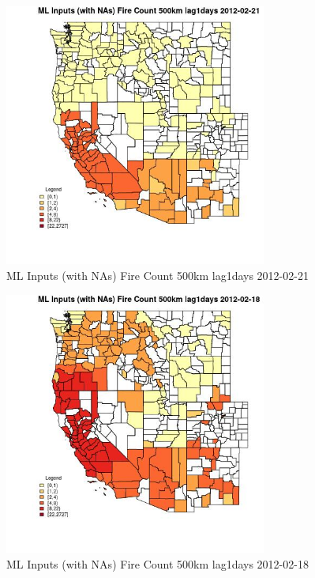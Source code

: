 \begin{figure} 
\centering  
\includegraphics[width=0.77\textwidth]{Code_Outputs/Report_ML_input_PM25_Step4_part_f_de_duplicated_aves_prioritize_24hr_obswNAs_CountyFire_Count_500km_lag1daysMean2012-02-21.jpg} 
\caption{\label{fig:Report_ML_input_PM25_Step4_part_f_de_duplicated_aves_prioritize_24hr_obswNAsCountyFire_Count_500km_lag1daysMean2012-02-21}ML Inputs (with NAs) Fire Count 500km lag1days 2012-02-21} 
\end{figure} 
 

\begin{figure} 
\centering  
\includegraphics[width=0.77\textwidth]{Code_Outputs/Report_ML_input_PM25_Step4_part_f_de_duplicated_aves_prioritize_24hr_obswNAs_CountyFire_Count_500km_lag1daysMean2012-02-18.jpg} 
\caption{\label{fig:Report_ML_input_PM25_Step4_part_f_de_duplicated_aves_prioritize_24hr_obswNAsCountyFire_Count_500km_lag1daysMean2012-02-18}ML Inputs (with NAs) Fire Count 500km lag1days 2012-02-18} 
\end{figure} 
 

